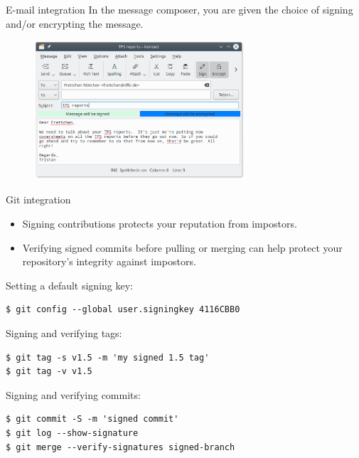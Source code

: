\documentclass[
mode=present,
paper=smartboard,
size=20pt,
]{powerdot}
\newcommand\vsp{\vspace{-16mm}}
\begin{document}
\begin{slide}[toc=]{E-mail integration}
  In the message composer, you are given the choice of signing and/or
  encrypting the message.
  \begin{figure}[H]
    \centering
    \includegraphics[width=0.7\textwidth]{images/kmail_send.eps}
    \label{fig:kmail_send}
  \end{figure}
\end{slide}

\makeatletter\renewcommand{\verbatim@font}{\footnotesize\tt}\makeatother
\begin{slide}[method=direct]{Git integration}
  \begin{itemize}
  \item Signing contributions protects your reputation from impostors.
  \item Verifying signed commits before pulling or merging can help
    protect your repository's integrity against impostors.
  \end{itemize}

Setting a default signing key:

\vsp
\begin{verbatim}
$ git config --global user.signingkey 4116CBB0
\end{verbatim}

Signing and verifying tags:

\vsp
\begin{verbatim}
$ git tag -s v1.5 -m 'my signed 1.5 tag'
$ git tag -v v1.5
\end{verbatim}

Signing and verifying commits:

\vsp
\begin{verbatim}
$ git commit -S -m 'signed commit'
$ git log --show-signature
$ git merge --verify-signatures signed-branch
\end{verbatim}
\end{slide}
\end{document}
